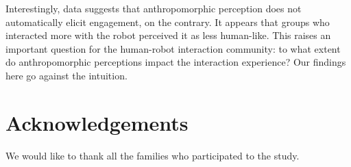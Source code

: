 \documentclass{sig-alternate}
\begin{document}
Interestingly, data suggests that anthropomorphic perception does not
automatically elicit  engagement, on the contrary. It appears that groups who
interacted more with the robot perceived it as less human-like. This raises an
important question for the human-robot interaction community: to what extent do
anthropomorphic perceptions impact the interaction experience? Our findings here
go against the intuition.


\section*{Acknowledgements}
%
We would like to thank all the families who participated to the study.




\balancecolumns
\end{document}
